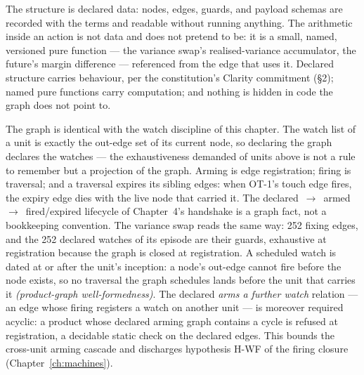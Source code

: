\documentclass[11pt,a4paper]{article}
\begin{document}
The structure is declared data: nodes, edges, guards, and payload schemas are recorded
with the terms and readable without running anything. The arithmetic inside an action is
not data and does not pretend to be: it is a small, named, versioned pure function ---
the variance swap's realised-variance accumulator, the future's margin difference ---
referenced from the edge that uses it. Declared structure carries behaviour, per the
constitution's Clarity commitment (\S 2); named pure functions carry computation; and
nothing is hidden in code the graph does not point to.

The graph is identical with the watch discipline of this chapter. The watch list of a
unit is exactly the out-edge set of its current node, so declaring the graph declares
the watches --- the exhaustiveness demanded of units above is not a rule to remember but
a projection of the graph. Arming is edge registration; firing is traversal; and a
traversal expires its sibling edges: when OT-1's touch edge fires, the expiry edge dies
with the live node that carried it. The declared~$\to$~armed~$\to$~fired/expired
lifecycle of Chapter~4's handshake is a graph fact, not a bookkeeping convention. The
variance swap reads the same way: 252 fixing edges, and the 252 declared watches of its
episode are their guards, exhaustive at registration because the graph is closed at
registration. A scheduled watch is dated at or after the unit's inception: a node's out-edge
cannot fire before the node exists, so no traversal the graph schedules lands before the unit
that carries it \emph{(product-graph well-formedness)}. The declared \emph{arms a further watch}
relation --- an edge whose firing registers a watch on another unit --- is moreover required
acyclic: a product whose declared arming graph contains a cycle is refused at registration, a
decidable static check on the declared edges. This bounds the cross-unit arming cascade and
discharges hypothesis H-WF of the firing closure (Chapter~\ref{ch:machines}).
\end{document}
